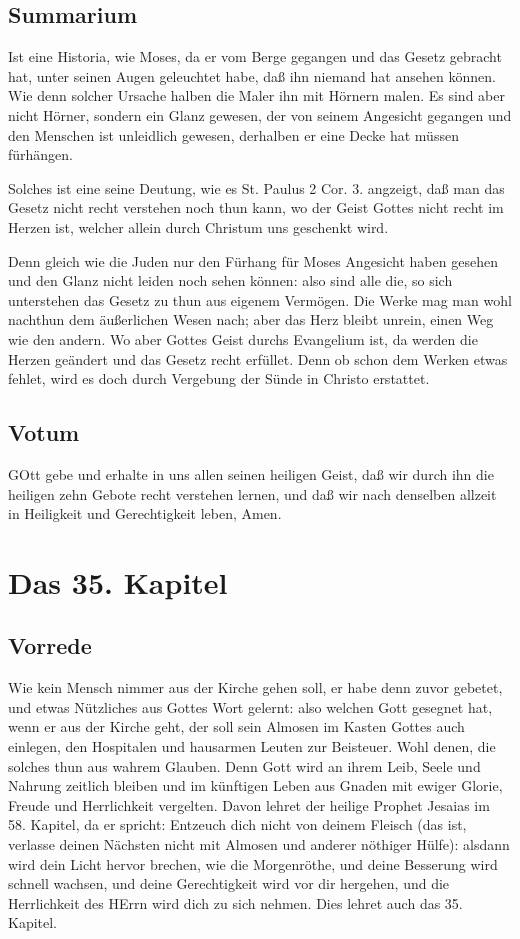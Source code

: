 \section{Summarium}

Ist eine Historia, wie Moses, da er vom Berge gegangen und das Gesetz gebracht hat, unter seinen Augen geleuchtet habe, daß ihn niemand hat ansehen können. Wie denn solcher Ursache halben die Maler ihn mit Hörnern malen. Es sind aber nicht Hörner, sondern ein Glanz gewesen, der von seinem Angesicht gegangen und den Menschen ist unleidlich gewesen, derhalben er eine Decke hat müssen fürhängen.

Solches ist eine seine Deutung, wie es St. Paulus 2 Cor. 3. angzeigt, daß man das Gesetz nicht recht verstehen noch thun kann, wo der Geist Gottes nicht recht im Herzen ist, welcher allein durch Christum uns geschenkt wird.

Denn gleich wie die Juden nur den Fürhang für Moses Angesicht haben gesehen und den Glanz nicht leiden noch sehen können: also sind alle die, so sich unterstehen das Gesetz zu thun aus eigenem Vermögen. Die Werke mag man wohl nachthun dem äußerlichen Wesen nach; aber das Herz bleibt unrein, einen Weg wie den andern. Wo aber Gottes Geist durchs Evangelium ist, da werden die Herzen geändert und das Gesetz recht erfüllet. Denn ob schon dem Werken etwas fehlet, wird es doch durch Vergebung der Sünde in Christo erstattet.

\section{Votum}

GOtt gebe und erhalte in uns allen seinen heiligen Geist, daß wir durch ihn die heiligen zehn Gebote recht verstehen lernen, und daß wir nach denselben allzeit in Heiligkeit und Gerechtigkeit leben, Amen.

\chapter{Das 35. Kapitel}

\section{Vorrede}

Wie kein Mensch nimmer aus der Kirche gehen soll, er habe denn zuvor gebetet, und etwas Nützliches aus Gottes Wort gelernt: also welchen Gott gesegnet hat, wenn er aus der Kirche geht, der soll sein Almosen im Kasten Gottes auch einlegen, den Hospitalen und hausarmen Leuten zur Beisteuer. Wohl denen, die solches thun aus wahrem Glauben. Denn Gott wird an ihrem Leib, Seele und Nahrung zeitlich bleiben und im künftigen Leben aus Gnaden mit ewiger Glorie, Freude und Herrlichkeit vergelten. Davon lehret der heilige Prophet Jesaias im 58. Kapitel, da er spricht: Entzeuch dich nicht von deinem Fleisch (das ist, verlasse deinen Nächsten nicht mit Almosen und anderer nöthiger Hülfe): alsdann wird dein Licht hervor brechen, wie die Morgenröthe, und deine Besserung wird schnell wachsen, und deine Gerechtigkeit wird vor dir hergehen, und die Herrlichkeit des HErrn wird dich zu sich nehmen. Dies lehret auch das 35. Kapitel.

